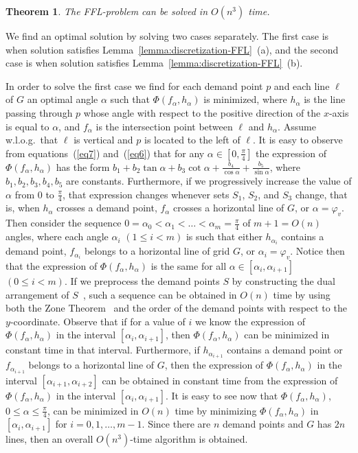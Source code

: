 \documentclass[11pt,a4paper,oneside,onecolumn]{article}
\newtheorem{theorem}{Theorem}[section]
\def\QED{\ensuremath{{\square}}}
\def\markatright#1{\leavevmode\unskip\nobreak\quad\hspace*{\fill}{#1}}
\newenvironment{proof}
{\begin{trivlist}\item[\hskip\labelsep{\bf Proof.}]}
{\markatright{\QED}\end{trivlist}}
\begin{document}
\begin{theorem}\label{theorem:free/var/sum}
The FFL-problem can be solved in $O(n^3)$ time.
\end{theorem}
\begin{proof}
We find an optimal solution by solving two cases separately. The
first case is when solution satisfies
Lemma~\ref{lemma:discretization-FFL}~(a), and the second case is
when solution satisfies Lemma~\ref{lemma:discretization-FFL}~(b).

In order to solve the first case we find for each demand point $p$
and each line $\ell$ of $G$ an optimal angle $\alpha$ such that
$\Phi(f_{\alpha},h_{\alpha})$ is minimized, where $h_{\alpha}$ is
the line passing through $p$ whose angle with respect to the
positive direction of the $x$-axis is equal to $\alpha$, and
$f_{\alpha}$ is the intersection point between $\ell$ and
$h_{\alpha}$. Assume w.l.o.g.\ that $\ell$ is vertical and $p$ is
located to the left of $\ell$. It is easy to observe from
equations~(\ref{eq7}) and~(\ref{eq6}) that for any $\alpha\in[0,\frac{\pi}{4}]$ the
expression of $\Phi(f_{\alpha},h_{\alpha})$ has the form
$b_1+b_2\tan\alpha+b_3\cot\alpha+\frac{b_4}{\cos\alpha}+\frac{b_5}{\sin\alpha}$,
where $b_1,b_2,b_3,b_4,b_5$ are constants. Furthermore, if we progressively
increase the value of $\alpha$ from $0$ to $\frac{\pi}{4}$, that
expression changes whenever sets $S_1$, $S_2$, and $S_3$ change,
that is, when $h_{\alpha}$ crosses a demand point, $f_{\alpha}$
crosses a horizontal line of $G$, or $\alpha=\varphi_v$. Then
consider the sequence
$0=\alpha_0<\alpha_1<\dots<\alpha_m=\frac{\pi}{4}$ of $m+1=O(n)$
angles, where each angle $\alpha_i$ $(1\leq i<m)$ is such that
either $h_{\alpha_i}$ contains a demand point, $f_{\alpha_i}$
belongs to a horizontal line of grid $G$, or $\alpha_i=\varphi_v$.
Notice then that the expression of $\Phi(f_{\alpha},h_{\alpha})$ is
the same for all $\alpha\in[\alpha_i,\alpha_{i+1}]$ $(0\leq i<m)$.
If we preprocess the demand points $S$ by constructing the dual
arrangement of $S$~\cite{o-rourke98}, such a sequence can be
obtained in $O(n)$ time by using both the Zone
Theorem~\cite{o-rourke98} and the order of the demand points with
respect to the $y$-coordinate. Observe that if for a value of $i$ we
know the expression of $\Phi(f_{\alpha},h_{\alpha})$ in the interval
$[\alpha_i,\alpha_{i+1}]$, then $\Phi(f_{\alpha},h_{\alpha})$ can be
minimized in constant time in that interval. Furthermore, if
$h_{\alpha_{i+1}}$ contains a demand point or $f_{\alpha_{i+1}}$
belongs to a horizontal line of $G$, then the expression of
$\Phi(f_{\alpha},h_{\alpha})$ in the interval
$[\alpha_{i+1},\alpha_{i+2}]$ can be obtained in constant time from
the expression of $\Phi(f_{\alpha},h_{\alpha})$ in the interval
$[\alpha_i,\alpha_{i+1}]$. It is easy to see now that
$\Phi(f_{\alpha},h_{\alpha})$, $0\leq\alpha\leq\frac{\pi}{4}$, can
be minimized in $O(n)$ time by minimizing
$\Phi(f_{\alpha},h_{\alpha})$ in $[\alpha_i,\alpha_{i+1}]$ for
$i=0,1,\dots,m-1$. Since there are $n$ demand points and $G$ has
$2n$ lines, then an overall $O(n^3)$-time algorithm is obtained.


\end{proof}
\end{document}
